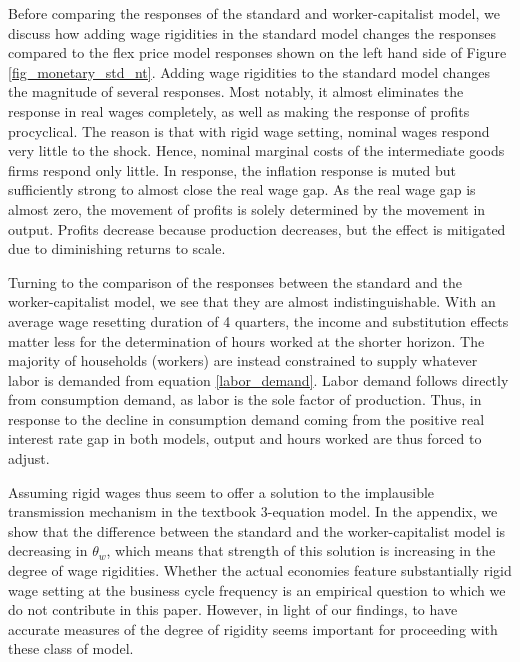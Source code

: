 Before comparing the responses of the standard and worker-capitalist model, we discuss how adding wage rigidities in the standard model changes the responses compared to the flex price model responses shown on the left hand side of Figure \ref{fig_monetary_std_nt}. Adding wage rigidities to the standard model changes the magnitude of several responses. Most notably, it almost eliminates the response in real wages completely, as well as making the response of profits procyclical. The reason is that with rigid wage setting, nominal wages respond very little to the shock. Hence, nominal marginal costs of the intermediate goods firms respond only little. In response, the inflation response is muted but sufficiently strong to almost close the real wage gap. As the real wage gap is almost zero, the movement of profits is solely determined by the movement in output. Profits decrease because production decreases, but the effect is mitigated due to diminishing returns to scale.       

Turning to the comparison of the responses between the standard and the worker-capitalist model, we see that they are almost indistinguishable. With an average wage resetting duration of 4 quarters, the income and substitution effects matter less for the determination of hours worked at the shorter horizon. The majority of households (workers) are instead constrained to supply whatever labor is demanded from equation \eqref{labor_demand}. Labor demand follows directly from consumption demand, as labor is the sole factor of production. Thus, in response to the decline in consumption demand coming from the positive real interest rate gap in both models, output and hours worked are thus forced to adjust. 


Assuming rigid wages thus seem to offer a solution to the implausible transmission mechanism in the textbook 3-equation model. In the appendix, we show that the difference between the standard and the worker-capitalist model is decreasing in  $\theta_w$, which means that strength of this solution is increasing in the degree of wage rigidities. Whether the actual economies feature substantially rigid wage setting at the business cycle frequency is an empirical question to which we do not contribute in this paper. However, in light of our findings, to have accurate measures of the degree of rigidity seems important for proceeding with these class of model.    

    
  
  



  

